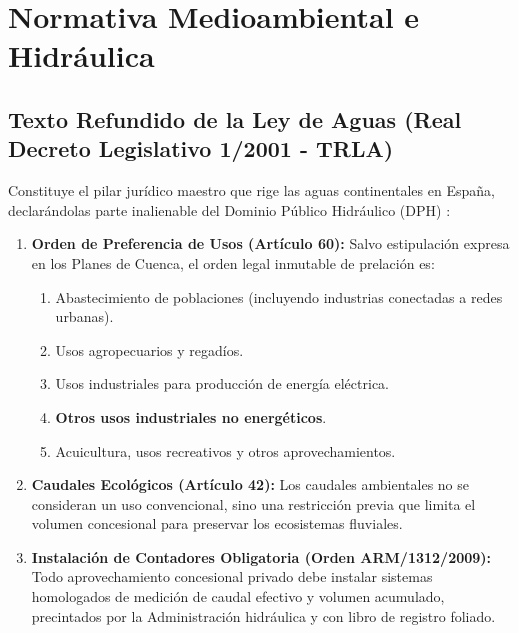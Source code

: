 \documentclass{report}
\begin{document}
\section{Normativa Medioambiental e Hidráulica}

\subsection{Texto Refundido de la Ley de Aguas (Real Decreto Legislativo 1/2001 - TRLA)}
Constituye el pilar jurídico maestro que rige las aguas continentales en España, declarándolas parte inalienable del Dominio Público Hidráulico (DPH) \cite{TRLA2001}:
\begin{enumerate}
    \item \textbf{Orden de Preferencia de Usos (Artículo 60):} Salvo estipulación expresa en los Planes de Cuenca, el orden legal inmutable de prelación es:
          \begin{enumerate}[label=\arabic*.]
              \item Abastecimiento de poblaciones (incluyendo industrias conectadas a redes urbanas).
              \item Usos agropecuarios y regadíos.
              \item Usos industriales para producción de energía eléctrica.
              \item \textbf{Otros usos industriales no energéticos}.
              \item Acuicultura, usos recreativos y otros aprovechamientos.
          \end{enumerate}
    \item \textbf{Caudales Ecológicos (Artículo 42):} Los caudales ambientales no se consideran un uso convencional, sino una restricción previa que limita el volumen concesional para preservar los ecosistemas fluviales.
    \item \textbf{Instalación de Contadores Obligatoria (Orden ARM/1312/2009):} Todo aprovechamiento concesional privado debe instalar sistemas homologados de medición de caudal efectivo y volumen acumulado, precintados por la Administración hidráulica y con libro de registro foliado.
\end{enumerate}
\end{document}
